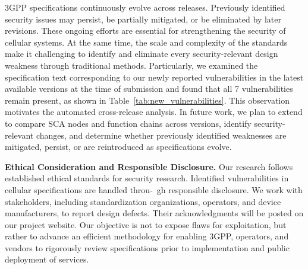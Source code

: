 3GPP specifications continuously evolve across releases. Previously identified security issues may persist, be partially mitigated, or be eliminated by later revisions. These ongoing efforts are essential for strengthening the security of cellular systems. At the same time, the scale and complexity of the standards make it challenging to identify and eliminate every security-relevant design weakness through traditional methods. Particularly, we examined the specification text corresponding to our newly reported vulnerabilities in the latest available versions at the time of submission and found that all 7 vulnerabilities remain present, as shown in Table~\ref{tab:new_vulnerabilities}. This observation motivates the automated cross-release analysis. In future work, we plan to extend \lm to compare SCA nodes and function chains across versions, identify security-relevant changes, and determine whether previously identified weaknesses are mitigated, persist, or are reintroduced as specifications evolve.






\noindent\textbf{Ethical Consideration and Responsible Disclosure.}
Our research follows established ethical standards for security research. Identified vulnerabilities in cellular specifications are handled throu-\ gh responsible disclosure.
We work with stakeholders, including standardization organizations, operators, and device manufacturers, to report design defects. Their acknowledgments will be posted on our project website.
Our objective is not to expose flaws for exploitation, but rather to advance an efficient methodology for enabling 3GPP, operators, and vendors to rigorously review specifications prior to implementation and public deployment of services. 